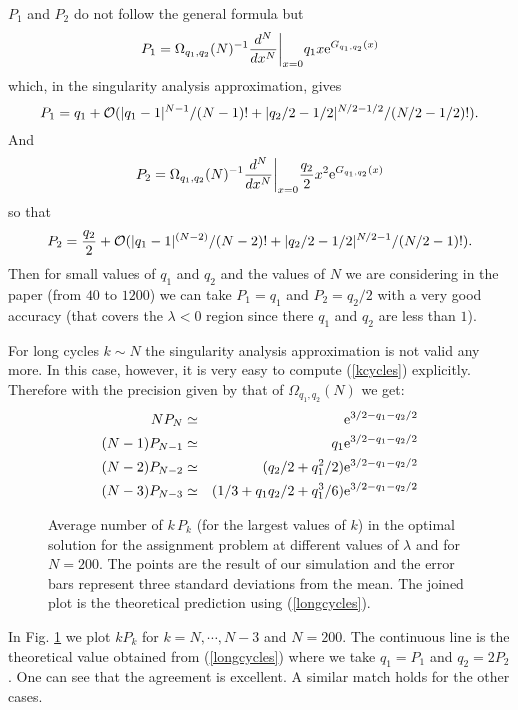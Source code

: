 \documentclass[]{iopart}
\def\ee{{\rm e}}
\begin{document}
$P_1$ and $P_2$ do not follow the general formula but
\begin{eqnarray}\label{eqPuno}
P_1=\Omega_{q_1,q_2}(N)^{-1}
\displaystyle\frac{d^N}{dx^N}\bigg\vert_{x=0}
q_1x\ee^{G_{q_1,q_2}(x)}
\end{eqnarray} 
which, in the singularity analysis approximation, gives
\begin{equation}
P_1=q_1+{\cal O}(|q_1-1|^{N-1}/(N-1)!+|q_2/2-1/2|^{N/2-1/2}/(N/2-1/2)!).
\label{pq1}
\end{equation}
And 
\begin{eqnarray}\label{eqPdos}
P_2=\Omega_{q_1,q_2}(N)^{-1}
{\displaystyle\frac{d^N}{dx^N}\bigg\vert_{x=0}
\frac{q_2}2 x^2\ee^{G_{q_1,q_2}(x)}}
\end{eqnarray} 
so that
\begin{equation}
P_2=\frac{q_2}2+
{\cal O}(|q_1-1|^{(N-2)}/(N-2)!+|q_2/2-1/2|^{N/2-1}/(N/2-1)!).
\label{pq2}
\end{equation}
Then for small values of $q_1$ and $q_2$ and the values of
$N$ we are considering in the paper (from $40$ to $1200$)
we can take $P_1=q_1$ and $P_2=q_2/2$ with a very good 
accuracy (that covers the $\lambda < 0$ region since there $q_1$ and 
$q_2$ are less than $1$).

For long cycles $k\sim N$ the singularity analysis approximation 
is not valid any
more. In this case, however, it is very easy to compute (\ref{kcycles}) 
explicitly.
Therefore with the precision given by that of 
$\Omega_{q_1,q_2}(N)$ we get:
\begin{eqnarray}\label{longcycles}
 \hskip 1.cm N P_N &\simeq&\ee^{3/2-q_1-q_2/2}\cr
(N-1)P_{N-1}&\simeq&q_1\ee^{3/2-q_1-q_2/2}\cr
(N-2)P_{N-2}&\simeq&(q_2/2+q_1^2/2)\ee^{3/2-q_1-q_2/2}\cr
(N-3)P_{N-3}&\simeq&({1/3}+ q_1 q_2 /2 +  q_1^3 /6)\ee^{3/2-q_1-q_2/2}
\end{eqnarray}

\begin{figure}[h!]

\caption{\small Average number of $k\, P_k$ (for the largest values of $k$) 
in the optimal solution for
  the assignment problem at different values of $\lambda$ and for $N=200$.
  The points are the result of our simulation and the error bars represent
 three standard deviations from the mean. The joined plot is the theoretical
 prediction  using  (\ref{longcycles}).}
\label{teornm2}
\end{figure}


In Fig. \ref{teornm2} we plot $kP_{k}$ for $k=N,\cdots , N-3$ and  $N=200$. The continuous
line is the theoretical value obtained from (\ref{longcycles})
where we take $q_1=P_1$ and $q_2=2P_2$. One can see
that the agreement is excellent. A similar match holds for the 
other cases.
\end{document}

